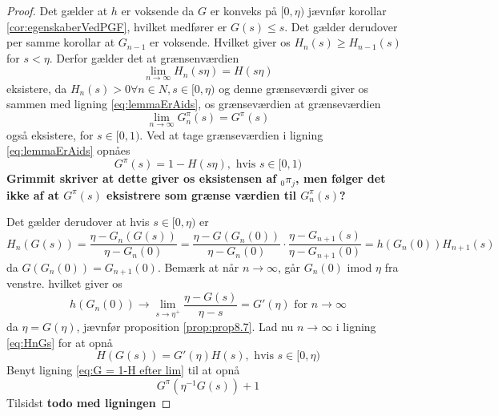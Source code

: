 \begin{proof}
Det gælder at $h$ er voksende da $G$ er konveks på $[0, \eta)$ jævnfør korollar \ref{cor:egenskaberVedPGF}, hvilket medfører er $G(s) \leq s$. Det gælder derudover per samme korollar at $G_{n - 1}$ er voksende. Hvilket giver os $H_n(s) \geq H_{n - 1}(s)$ for $s < \eta$. Derfor gælder det at grænsenværdien 
\begin{equation*}
    \lim_{n \to \infty} H_n(s\eta) = H(s\eta)
\end{equation*}
eksistere, da $H_n(s) > 0 \forall n \in N, s \in [0, \eta)$ og denne grænseværdi giver os sammen med ligning \ref{eq:lemmaErAids}, os grænseværdien at grænseværdien
\begin{equation*}
    \lim_{n \to \infty} G_n^\pi(s) = G^\pi(s)
\end{equation*}
også eksistere, for $s \in [0, 1)$. Ved at tage grænseværdien i ligning \eqref{eq:lemmaErAids} opnåes
\begin{equation*}\label{eq:G = 1-H efter lim}
   G^\pi(s) = 1 - H(s \eta), \text{ hvis } s \in [0, 1) 
\end{equation*}
\textbf{Grimmit skriver at dette giver os eksistensen af ${}_0\pi_j$, men følger det ikke af at $G^\pi(s)$ eksistrere som grænse værdien til $G^\pi_n(s)$?} 

Det gælder derudover at hvis $s \in [0, \eta)$ er 
\begin{equation*}\label{eq:HnGs}
    H_n(G(s)) = \frac{\eta - G_n(G(s))}{\eta - G_n(0)} = \frac{\eta - G(G_n(0))}{\eta - G_n(0)} \cdot \frac{\eta - G_{n + 1}(s)}{\eta - G_{n + 1}(0)} = h(G_n(0))H_{n + 1}(s)
\end{equation*}
da $G(G_n(0)) = G_{n + 1}(0)$.
Bemærk at når $n \to \infty$, går $G_n(0)$ imod $\eta$ fra venstre. hvilket giver os
\begin{equation*}
    h(G_n(0)) \to \lim_{s \to \eta^+} \frac{\eta - G(s)}{\eta - s} = G'(\eta) \text{ for } n \to \infty
\end{equation*}
da $\eta = G(\eta)$, jævnfør proposition \ref{prop:prop8.7}. Lad nu $n \to \infty$ i ligning \eqref{eq:HnGs} for at opnå
\begin{equation*}
    H(G(s)) = G'(\eta)H(s), \text { hvis } s \in [0, \eta)
\end{equation*}
Benyt ligning \ref{eq:G = 1-H efter lim} til at opnå
\begin{equation*}
    G^\pi(\eta^{-1}G(s)) + 1
\end{equation*}
Tilsidst \textbf{todo med ligningen}
\end{proof}

